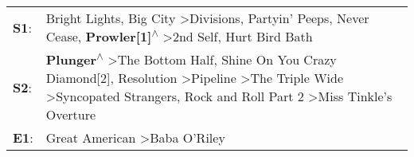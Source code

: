 \begin{supertabular}{p{0.03\textwidth}p{0.92\textwidth}}
 \textbf{S1}:  &                                                                                                                                                         Bright Lights, Big City\textsuperscript{} \textgreater \enspace Divisions\textsuperscript{}, \enspace Partyin' Peeps\textsuperscript{}, \enspace Never Cease\textsuperscript{}, \enspace \textbf{Prowler[1]\textsuperscript{$\wedge$}} \textgreater \enspace 2nd Self\textsuperscript{}, \enspace Hurt Bird Bath\textsuperscript{}  \enspace  \\
 \textbf{S2}:  &  \textbf{Plunger\textsuperscript{$\wedge$}} \textgreater \enspace The Bottom Half\textsuperscript{}, \enspace Shine On You Crazy Diamond[2]\textsuperscript{}, \enspace Resolution\textsuperscript{} \textgreater \enspace Pipeline\textsuperscript{} \textgreater \enspace The Triple Wide\textsuperscript{} \textgreater \enspace Syncopated Strangers\textsuperscript{}, \enspace Rock and Roll Part 2\textsuperscript{} \textgreater \enspace Miss Tinkle's Overture\textsuperscript{}  \enspace  \\
 \textbf{E1}:  &                                                                                                                                                                                                                                                                                                                                                                                                      Great American\textsuperscript{} \textgreater \enspace Baba O'Riley\textsuperscript{}  \enspace  \\
\end{supertabular}
